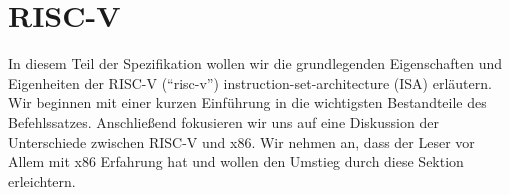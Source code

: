 \chapter{RISC-V}

In diesem Teil der Spezifikation wollen wir die grundlegenden Eigenschaften und
Eigenheiten der RISC-V (``risc-v'') instruction-set-architecture (ISA)
erläutern. Wir beginnen mit einer kurzen Einführung in die wichtigsten
Bestandteile des Befehlssatzes. Anschließend fokusieren wir uns auf eine
Diskussion der Unterschiede zwischen RISC-V und x86. Wir nehmen an, dass der
Leser vor Allem mit x86 Erfahrung hat und wollen den Umstieg durch diese Sektion
erleichtern.


